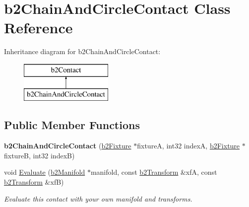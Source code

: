 \hypertarget{classb2_chain_and_circle_contact}{}\section{b2\+Chain\+And\+Circle\+Contact Class Reference}
\label{classb2_chain_and_circle_contact}
Inheritance diagram for b2\+Chain\+And\+Circle\+Contact\+:\begin{figure}[H]
\begin{center}
\leavevmode
\includegraphics[height=2.000000cm]{classb2_chain_and_circle_contact}
\end{center}
\end{figure}
\subsection*{Public Member Functions}
\begin{DoxyCompactItemize}
\item 
{\bfseries b2\+Chain\+And\+Circle\+Contact} (\hyperlink{classb2_fixture}{b2\+Fixture} $\ast$fixtureA, int32 indexA, \hyperlink{classb2_fixture}{b2\+Fixture} $\ast$fixtureB, int32 indexB)\hypertarget{classb2_chain_and_circle_contact_a7303997b9af2b859346b4fc4d7e107d5}{}\label{classb2_chain_and_circle_contact_a7303997b9af2b859346b4fc4d7e107d5}

\item 
void \hyperlink{classb2_chain_and_circle_contact_afe52ebd870f24cbecedd1db662705f12}{Evaluate} (\hyperlink{structb2_manifold}{b2\+Manifold} $\ast$manifold, const \hyperlink{structb2_transform}{b2\+Transform} \&xfA, const \hyperlink{structb2_transform}{b2\+Transform} \&xfB)\hypertarget{classb2_chain_and_circle_contact_afe52ebd870f24cbecedd1db662705f12}{}\label{classb2_chain_and_circle_contact_afe52ebd870f24cbecedd1db662705f12}

\begin{DoxyCompactList}\small\item\em Evaluate this contact with your own manifold and transforms. \end{DoxyCompactList}\end{DoxyCompactItemize}
